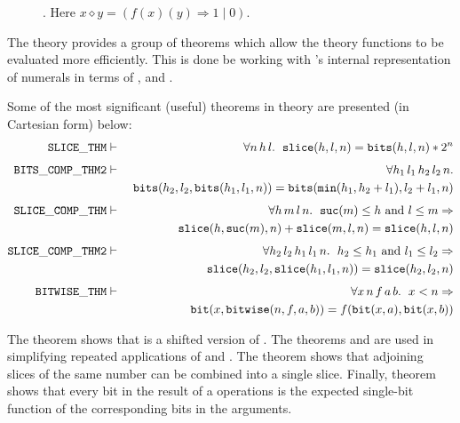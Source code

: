 {\begin{figure}
\begin{center}

\end{center}
\caption{. Here $x\diamond y = (f(x)(y) \Rightarrow 1 \mid 0)$.\label{bitwise}}
\end{figure}

The  theory provides a group of theorems which allow the  theory functions to be evaluated more efficiently.
This is done be working with \HOL's internal representation of numerals \ie{} in terms of ,  and .

Some of the most significant (useful) theorems in  theory are presented (in Cartesian form) below:
\begin{eqnarray*}
\mathtt{SLICE\_THM} & \vdash & \forall n\,h\,l.\ \;\mathtt{slice}(h,l,n) = \mathtt{bits}(h,l,n) * 2^n \\[4pt]
\mathtt{BITS\_COMP\_THM2} & \vdash & \forall h_1\,l_1\,h_2\,l_2\,n.\\*
&& \ \mathtt{bits}(h_2,l_2,\mathtt{bits}(h_1,l_1,n)) = \mathtt{bits}(\mathtt{min}(h_1,h_2 + l_1),l_2 + l_1,n) \\[4pt]
\mathtt{SLICE\_COMP\_THM} & \vdash &
   \forall h\,m\,l\,n.\ \;\mathtt{suc}(m) \leq h \mbox{ and } l \leq m \Rightarrow \\*
&& \quad \mathtt{slice}(h,\mathtt{suc}(m),n) + \mathtt{slice}(m,l,n) = \mathtt{slice}(h,l,n) \\[4pt]
\mathtt{SLICE\_COMP\_THM2} & \vdash &
   \forall h_2\,l_2\,h_1\,l_1\,n.\ \; h_2 \leq h_1 \mbox{ and } l_1 \leq l_2 \Rightarrow \\*
&& \quad \mathtt{slice}(h_2,l_2,\mathtt{slice}(h_1,l_1,n)) = \mathtt{slice}(h_2,l_2,n) \\[4pt]
\mathtt{BITWISE\_THM} & \vdash &
   \forall x\,n\,f\,a\,b.\ \;
        x < n \Rightarrow \\*
&& \quad \mathtt{bit}(x,\mathtt{bitwise}(n,f,a,b)) = f(\mathtt{bit}(x,a),\mathtt{bit}(x,b))
\end{eqnarray*}

\noindent
The theorem  shows that  is a shifted version
of .  The theorems  and
 are used in simplifying repeated applications
of  and .  The theorem  shows
that adjoining slices of the same number can be combined into a single
slice.  Finally, theorem  shows that every bit in the
result of a  operations is the expected single-bit
function of the corresponding bits in the arguments.

}
